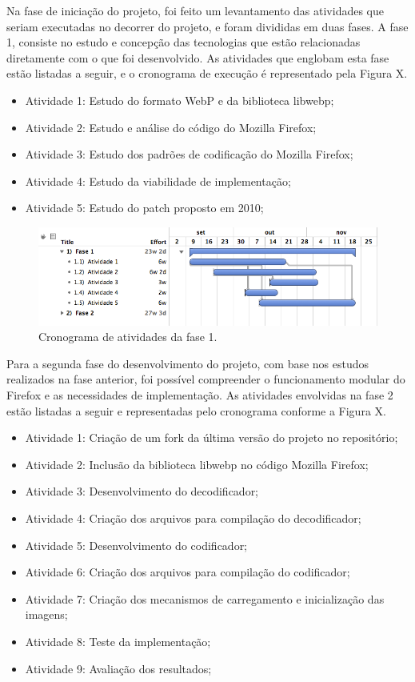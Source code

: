 \documentclass[espaco=simples,appendix=Name]{abnt}
\begin{document}
Na fase de iniciação do projeto, foi feito um levantamento das atividades que seriam executadas no decorrer do projeto, e foram divididas em duas fases. A fase 1, consiste no estudo e concepção das tecnologias que estão relacionadas diretamente com o que foi desenvolvido. As atividades que englobam esta fase estão listadas a seguir, e o cronograma de execução é representado pela Figura X.

\begin{itemize}
	\item Atividade 1: Estudo do formato WebP e da biblioteca libwebp;
	\item Atividade 2: Estudo e análise do código do Mozilla Firefox;
	\item Atividade 3: Estudo dos padrões de codificação do Mozilla Firefox;
	\item Atividade 4: Estudo da viabilidade de implementação;
	\item Atividade 5: Estudo do patch proposto em 2010;
\end{itemize}	

\begin{figure}[h]
  \centering
    \includegraphics[scale=0.5]{fase1.png}
  \caption{Cronograma de atividades da fase 1.}
\end{figure}

Para a segunda fase do desenvolvimento do projeto, com base nos estudos realizados na fase anterior, foi possível compreender o funcionamento modular do Firefox e as necessidades de implementação. As atividades envolvidas na fase 2 estão listadas a seguir e representadas pelo cronograma conforme a Figura X.

\begin{itemize}
	\item Atividade 1: Criação de um fork da última versão do projeto no repositório;
	\item Atividade 2: Inclusão da biblioteca libwebp no código Mozilla Firefox;
	\item Atividade 3: Desenvolvimento do decodificador;
	\item Atividade 4: Criação dos arquivos para compilação do decodificador;
	\item Atividade 5: Desenvolvimento do codificador;
	\item Atividade 6: Criação dos arquivos para compilação do codificador;
	\item Atividade 7: Criação dos mecanismos de carregamento e inicialização das imagens;
	\item Atividade 8: Teste da implementação;
	\item Atividade 9: Avaliação dos resultados;
\end{itemize}	
\end{document}
